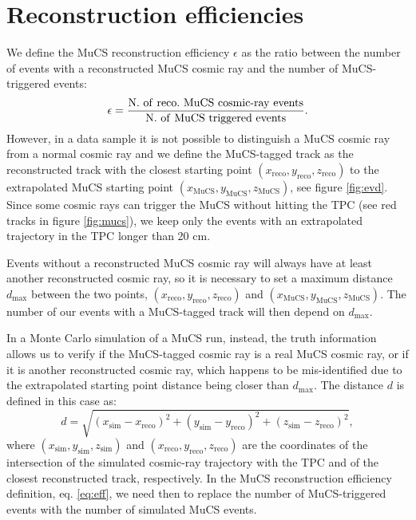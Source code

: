 \documentclass[a4paper]{scrartcl}
\def\myhyphen{{\hbox{-}}}
\begin{document}
\section{Reconstruction efficiencies}\label{sec:reco}

We define the MuCS reconstruction efficiency $\epsilon$ as the ratio between the number of events with a reconstructed MuCS cosmic ray and the number of MuCS-triggered events:
\begin{equation}\label{eq:eff}
  \epsilon = \frac{\mathrm{N.~of~reco.~MuCS~cosmic\myhyphen ray~events}}{\mathrm{N.~of~MuCS~triggered~events}}.
\end{equation}
However, in a data sample it is not possible to distinguish a MuCS cosmic ray from a normal cosmic ray and we define the MuCS-tagged track as the reconstructed track with the closest starting point $(x_{\mathrm{reco}},y_{\mathrm{reco}},z_{\mathrm{reco}})$ to the extrapolated MuCS starting point $(x_{\mathrm{MuCS}},y_{\mathrm{MuCS}},z_{\mathrm{MuCS}})$, see figure \ref{fig:evd}. Since some cosmic rays can trigger the MuCS without hitting the TPC (see red tracks in figure \ref{fig:mucs}), we keep only the events with an extrapolated trajectory in the TPC longer than 20 cm.

Events without a reconstructed MuCS cosmic ray will always have at least another reconstructed cosmic ray, so it is necessary to set a maximum distance $d_{\mathrm{max}}$ between the two points, $(x_{\mathrm{reco}},y_{\mathrm{reco}},z_{\mathrm{reco}})$ and $(x_{\mathrm{MuCS}},y_{\mathrm{MuCS}},z_{\mathrm{MuCS}})$. The number of our events with a MuCS-tagged track will then depend on $d_{\mathrm{max}}$.

In a Monte Carlo simulation of a MuCS run, instead, the truth information allows us to verify if the MuCS-tagged cosmic ray is a real MuCS cosmic ray, or if it is another reconstructed cosmic ray, which happens to be mis-identified due to the extrapolated starting point distance being closer than $d_{\mathrm{max}}$.
The distance $d$ is defined in this case as:
\begin{equation}\label{eq:d_mc}
d = \sqrt{(x_{\mathrm{sim}}-x_{\mathrm{reco}})^2+(y_{\mathrm{sim}}-y_{\mathrm{reco}})^2+(z_{\mathrm{sim}}-z_{\mathrm{reco}})^2},
\end{equation}
where $(x_{\mathrm{sim}},y_{\mathrm{sim}},z_{\mathrm{sim}})$ and $(x_{\mathrm{reco}},y_{\mathrm{reco}},z_{\mathrm{reco}})$ are the coordinates of the intersection of the simulated cosmic-ray trajectory with the TPC and of the closest reconstructed track, respectively. In the MuCS reconstruction efficiency definition, eq. \eqref{eq:eff}, we need then to replace the number of MuCS-triggered events with the number of simulated MuCS events.
\end{document}
